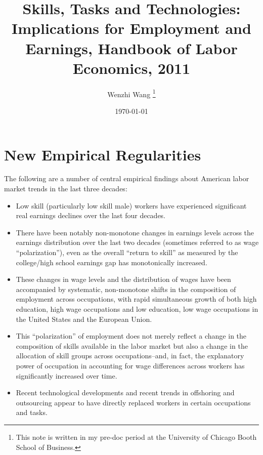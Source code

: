 \documentclass[12pt]{article}
\theoremstyle{definition}
\begin{document}

\title{\bf Skills, Tasks and Technologies: Implications for Employment and Earnings, Handbook of Labor Economics, 2011}
\author{Wenzhi Wang \thanks{This note is written in my pre-doc period at the University of Chicago Booth School of Business.} } 
\date{\today}
\maketitle

\citet{acemogluSkillsTasksTechnologies2011}


\section{New Empirical Regularities} \label{sec_empicial_regularities}

The following are a number of central empirical findings about American labor market trends in the last three decades: 
\begin{itemize}[topsep=0pt, leftmargin=30pt, itemsep=0pt]
	\setlength{\parskip}{8pt} 
	\item Low skill (particularly low skill male) workers have experienced significant real earnings declines over the last four decades.
	\item There have been notably non-monotone changes in earnings levels across the earnings distribution over the last two decades (sometimes referred to as wage ``polarization''), even as the overall ``return to skill'' as measured by the college/high school earnings gap has monotonically increased.
	\item These changes in wage levels and the distribution of wages have been accompanied by systematic, non-monotone shifts in the composition of employment across occupations, with rapid simultaneous growth of both high education, high wage occupations and low education, low wage occupations in the United States and the European Union.
	\item This ``polarization'' of employment does not merely reflect a change in the composition of skills available in the labor market but also a change in the allocation of skill groups across occupations--and, in fact, the explanatory power of occupation in accounting for wage differences across workers has significantly increased over time.
	\item Recent technological developments and recent trends in offshoring and outsourcing appear to have directly replaced workers in certain occupations and tasks.
\end{itemize}
\end{document}

